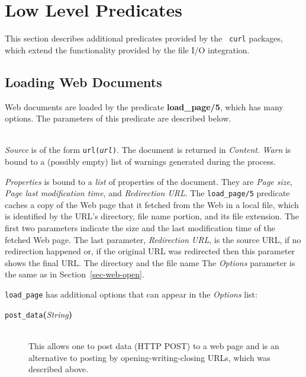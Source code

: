 \section{Low Level Predicates}

This section describes additional predicates provided by the {\tt
  curl} packages, which extend the functionality provided by the file I/O
integration.

\subsection{Loading Web Documents}

Web documents are loaded by the predicate {\bf load\_page/5}, which has
many options. The parameters of this predicate are described below.


\begin{description}
\item[load\_page({\it +Source, +Options, -Properties, -Content, -Warn})]\mbox{}
  \\
  {\it Source} is of the form {\tt url({\it {url}})}.
  The document is returned in {\it Content}.
  {\it Warn} is bound to a (possibly empty) list of warnings generated during the process.

  {\it Properties} is bound to a \emph{list} of properties of the document. They
  are {\it Page size}, {\it Page last modification time}, and \emph{Redirection
  URL}.  
  The {\tt load\_page/5}  predicate caches a copy of the Web page that it
  fetched from the Web in a local file, which is identified by the URL's
  directory, file name portion, and  its file
    extension. The first two parameters indicate the size and the last
  modification time of the fetched Web page.
  The last parameter, \emph{Redirection URL}, is the source URL, if no
  redirection happened or, if the original URL was redirected then this
  parameter shows the final URL.
  The directory and the file name 
  The \emph{Options} parameter is the same as in
  Section~\ref{sec-web-open}.

  \texttt{load\_page} has additional options that can appear in the
  \emph{Options} list:
  \begin{description}
  \item[{\tt post\_data}{\bf (}{\it String}{\bf )}]\mbox{}\\
    This allows one to post data (HTTP POST)
    to a web page and is an alternative to
    posting by opening-writing-closing URLs, which was described above.


\end{description}
\end{description}
